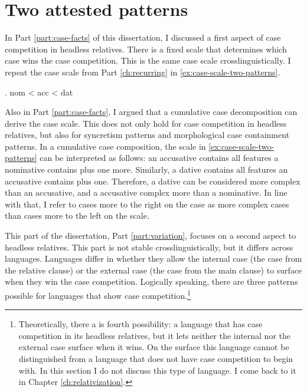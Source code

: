 
\chapter{Two attested patterns}

In Part \ref{part:case-facts} of this dissertation, I discussed a first aspect of case competition in headless relatives. There is a fixed scale that determines which case wins the case competition. This is the same case scale crosslinguistically. I repeat the case scale from Part \ref{ch:recurring} in \ref{ex:case-scale-two-patterns}.

\ex. \ac{nom} < \ac{acc} < \ac{dat}\label{ex:case-scale-two-patterns}

Also in Part \ref{part:case-facts}, I argued that a cumulative case decomposition can derive the case scale. This does not only hold for case competition in headless relatives, but also for syncretism patterns and morphological case containment patterns. In a cumulative case composition, the scale in \ref{ex:case-scale-two-patterns} can be interpreted as follows: an accusative contains all features a nominative contains plus one more. Similarly, a dative contains all features an accusative contains plus one. Therefore, a dative can be considered more complex than an accusative, and a accusative complex more than a nominative. In line with that, I refer to cases more to the right on the case as more complex cases than cases more to the left on the scale.

This part of the dissertation, Part \ref{part:variation}, focuses on a second aspect to headless relatives. This part is not stable crosslinguistically, but it differs across languages. Languages differ in whether they allow the internal case (the case from the relative clause) or the external case (the case from the main clause) to surface when they win the case competition. Logically speaking, there are three patterns possible for languages that show case competition.\footnote{
Theoretically, there a is fourth possibility: a language that has case competition in its headless relatives, but it lets neither the internal nor the external case surface when it wins. On the surface this language cannot be distinguished from a language that does not have case competition to begin with. In this section I do not discuss this type of language. I come back to it in Chapter \ref{ch:relativization}.
}

